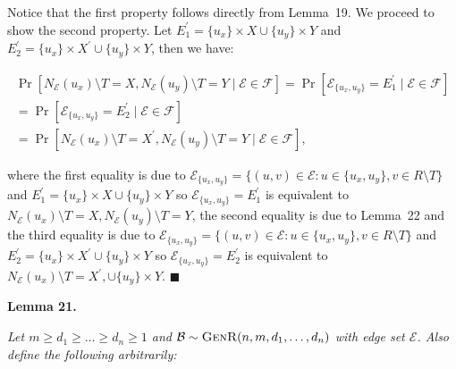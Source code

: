 Notice that the first property follows directly from Lemma 19.
We proceed to show the second property.
Let $E^{\prime}_{1}=\{u_{x}\}\times X\cup\{u_{y}\}\times Y$ and $E^{\prime}_{2}=\{u_{x}\}\times X^{\prime}\cup\{u_{y}\}\times Y$, then we have:\par


\[\begin{gathered}
\displaystyle\Pr[N_{\mathcal{E}}(u_{x})\setminus T=X,N_{\mathcal{E}}(u_{y})\setminus T=Y\mid\mathcal{E}\in\mathscr{F}] \displaystyle=\Pr[\mathcal{E}_{\{u_{x},u_{y}\}}=E^{\prime}_{1}\mid\mathcal{E}\in\mathscr{F}] \\
\displaystyle=\Pr[\mathcal{E}_{\{u_{x},u_{y}\}}=E^{\prime}_{2}\mid\mathcal{E}\in\mathscr{F}] \\
\displaystyle=\Pr[N_{\mathcal{E}}(u_{x})\setminus T=X^{\prime},N_{\mathcal{E}}(u_{y})\setminus T=Y\mid\mathcal{E}\in\mathscr{F}],
\end{gathered}\]


where the first equality is due to $\mathcal{E}_{\{u_{x},u_{y}\}}=\{(u,v)\in\mathcal{E}:u\in\{u_{x},u_{y}\},v\in R\setminus T\}$ and $E^{\prime}_{1}=\{u_{x}\}\times X\cup\{u_{y}\}\times Y$ so $\mathcal{E}_{\{u_{x},u_{y}\}}=E^{\prime}_{1}$ is equivalent to $N_{\mathcal{E}}(u_{x})\setminus T=X,N_{\mathcal{E}}(u_{y})\setminus T=Y$, the second equality is due to Lemma 22 and the third equality is due to $\mathcal{E}_{\{u_{x},u_{y}\}}=\{(u,v)\in\mathcal{E}:u\in\{u_{x},u_{y}\},v\in R\setminus T\}$ and $E^{\prime}_{2}=\{u_{x}\}\times X^{\prime}\cup\{u_{y}\}\times Y$ so $\mathcal{E}_{\{u_{x},u_{y}\}}=E^{\prime}_{2}$ is equivalent to $N_{\mathcal{E}}(u_{x})\setminus T=X^{\prime},\cup\{u_{y}\}\times Y$.
\ensuremath{\blacksquare}\par






\par\medskip\noindent\textbf{\textbf{Lemma 21}\textbf{.}}\par



\emph{Let $m\geq d_{1}\geq\dots\geq d_{n}\geq 1$ and $\mathcal{B}\sim\textsc{GenR}(n,m,d_{1},\dots,d_{n})$ with edge set $\mathcal{E}$.
Also define the following arbitrarily:}\par


